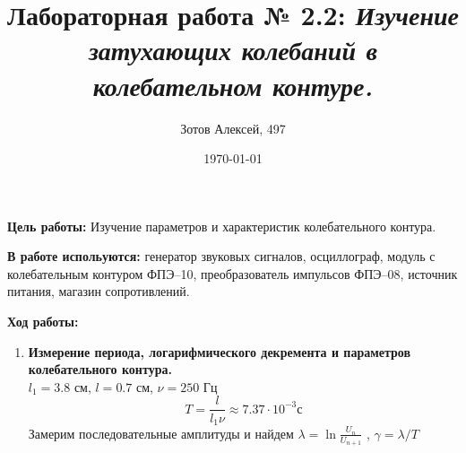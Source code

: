 \documentclass[10pt]{article}
\title{Лабораторная работа № 2.2: {\it Изучение затухающих колебаний в колебательном контуре.}}
\author{Зотов Алексей, 497}
\date{\today}
\begin{document}
\maketitle
\textbf{Цель работы:} Изучение параметров и характеристик колебательного контура.

\textbf{В работе испольуются:} \small{генератор звуковых сигналов, осциллограф, модуль с колебательным контуром ФПЭ–10, преобразователь импульсов ФПЭ–08, источник питания, магазин сопротивлений.}

\textbf{Ход работы:}
    \begin{enumerate}
    \item \textbf{Измерение периода, логарифмического декремента и параметров колебательного контура.} \\
    $l_1 = 3.8 $ см, $l = 0.7$ см, $\nu = 250$ Гц \\
    \begin{equation}
        T = \frac{l}{l_1 \nu} \approx 7.37 \cdot 10^{-3} \text{с} 
    \end{equation}
    Замерим последовательные амплитуды и найдем $\lambda = \ln{\frac{U_n}{U_{n+1}}}$ , $\gamma = \lambda/T$\\


\end{enumerate}
\end{document}
